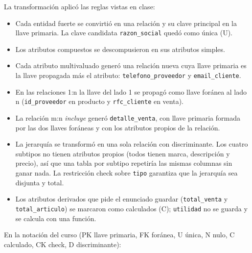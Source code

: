 \documentclass[12pt,a4paper]{article}
\newcommand{\cod}[1]{{\ttfamily\nolinkurl{#1}}}
\begin{document}
La transformación aplicó las reglas vistas en clase:

\begin{itemize}[leftmargin=1.2cm, itemsep=0.2em]
\item Cada entidad fuerte se convirtió en una relación y su clave principal en la
llave primaria. La clave candidata \cod{razon_social} quedó como única (U).
\item Los atributos compuestos se descompusieron en sus atributos simples.
\item Cada atributo multivaluado generó una relación nueva cuya llave primaria es la
llave propagada más el atributo: \cod{telefono_proveedor} y \cod{email_cliente}.
\item En las relaciones 1:n la llave del lado 1 se propagó como llave foránea al
lado n (\cod{id_proveedor} en producto y \cod{rfc_cliente} en venta).
\item La relación m:n \textit{incluye} generó \cod{detalle_venta}, con llave
primaria formada por las dos llaves foráneas y con los atributos propios de la
relación.
\item La jerarquía se transformó en una sola relación con discriminante. Los cuatro
subtipos no tienen atributos propios (todos tienen marca, descripción y precio),
así que una tabla por subtipo repetiría las mismas columnas sin ganar nada. La
restricción check sobre \cod{tipo} garantiza que la jerarquía sea disjunta y total.
\item Los atributos derivados que pide el enunciado guardar (\cod{total_venta} y
\cod{total_articulo}) se marcaron como calculados (C); \cod{utilidad} no se guarda
y se calcula con una función.
\end{itemize}

En la notación del curso (PK llave primaria, FK foránea, U única, N nulo, C
calculado, CK check, D discriminante):
\end{document}
